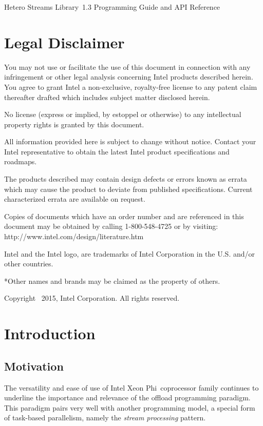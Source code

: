 \documentclass[a4,oneside]{book}
\newcommand{\ixp}{Intel\textregistered{} Xeon Phi\texttrademark{}}
\newcommand{\heterostreams}{Hetero Streams Library}
\begin{document}
\hypersetup{pageanchor=false}
\begin{titlepage}
\vspace*{7cm}
\begin{center}
    {\Large \heterostreams\ 1.3 Programming Guide and API Reference}\\[2em]
\end{center}
\end{titlepage}
\clearemptydoublepage
\chapter*{Legal Disclaimer}
You may not use or facilitate the use of this document in connection with any infringement or other legal analysis concerning Intel products described herein. You agree to grant Intel a non-exclusive, royalty-free license to any patent claim thereafter drafted which includes subject matter disclosed herein.

No license (express or implied, by estoppel or otherwise) to any intellectual property rights is granted by this document.

All information provided here is subject to change without notice. Contact your Intel representative to obtain the latest Intel product specifications and roadmaps.

The products described may contain design defects or errors known as errata which may cause the product to deviate from published specifications. Current characterized errata are available on request.

Copies of documents which have an order number and are referenced in this document may be obtained by calling 1-800-548-4725 or by visiting: http://www.intel.com/design/literature.htm

Intel and the Intel logo, are trademarks of Intel Corporation in the U.S. and/or other countries.

*Other names and brands may be claimed as the property of others.

Copyright \textcopyright\ 2015, Intel Corporation. All rights reserved.
\clearemptydoublepage

\tableofcontents
\clearemptydoublepage
{}
\hypersetup{pageanchor=true}

\chapter{Introduction}
\section{Motivation}
The versatility and ease of use of \ixp\ coprocessor family continues to underline the importance and relevance of the offload programming paradigm.
This paradigm pairs very well with another programming model, a special form of task-based parallelism, namely the \emph{stream processing} pattern.
\end{document}
